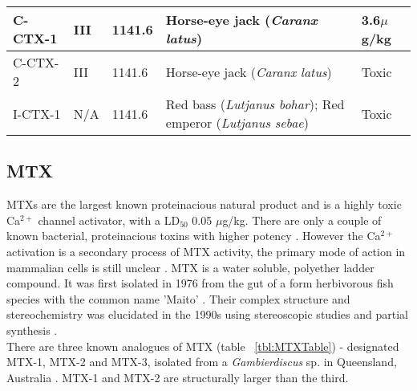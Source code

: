 \documentclass[12pt]{article}
\begin{document}
\begin{table}
\begin{tabular}{  | p{2cm} | p{1.5cm} | p{2.5cm} | p{4cm} | p{4cm} |}
 \hline
 C-CTX-1 & III & 1141.6 \cite{vernoux1997isolation,pottier2002characterisation} & Horse-eye jack (\emph{Caranx latus}) \cite{vernoux1997isolation,pottier2002characterisation} & 3.6$\mu$g/kg \cite{vernoux1997isolation}\\
 \hline
 C-CTX-2 & III & 1141.6 \cite{vernoux1997isolation,pottier2002characterisation}& Horse-eye jack (\emph{Caranx latus}) \cite{vernoux1997isolation,pottier2002characterisation} & Toxic \cite{vernoux1997isolation}\\
 \hline
 I-CTX-1 & N/A & 1141.6 \cite{hamilton2002isolation}& Red bass (\emph{Lutjanus bohar}); Red emperor (\emph{Lutjanus sebae}) \cite{hamilton2002isolation} & Toxic \cite{hamilton2002isolation} \\
 \hline
\end{tabular}
\end{table}
\FloatBarrier

\subsection{MTX}

MTXs are the largest known proteinacious natural product \cite{yokoyama1988some,murata1993structure} and is a highly toxic Ca$^{2+}$ channel activator, with a LD$_{50}$ 0.05 $\mu$g/kg. There are only a couple of known bacterial, proteinacious toxins with higher potency \cite{yokoyama1988some,murata1993structure}. However the Ca$^{2+}$ activation is a secondary process of MTX activity, the primary mode of action in mammalian cells  is still unclear \cite{van2000diversity}. MTX is a water soluble, polyether ladder compound. It was first isolated in 1976 from the gut of a form herbivorous fish species with the common name 'Maito' \cite{yasumoto1976toxicity}. Their complex structure and stereochemistry was elucidated in the 1990s using stereoscopic studies and partial synthesis \cite{murata1993structure,murata1994structure,satake1995structural,nonomura1996complete,zheng1996complete}. \\

There are three known analogues of MTX (table ~\ref{tbl:MTXTable}) - designated MTX-1, MTX-2 and MTX-3, isolated from a \emph{Gambierdiscus} sp. in Queensland, Australia \cite{holmes1994purification}. MTX-1 and MTX-2 are structurally larger than the third. \\ %

\end{document}
